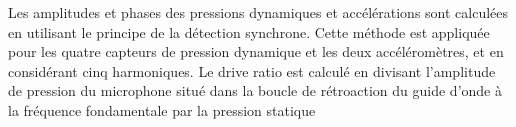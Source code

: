 Les amplitudes et phases des pressions dynamiques et accélérations sont calculées en utilisant le principe de la détection synchrone. Cette méthode est appliquée pour les quatre capteurs de pression dynamique et les deux accéléromètres, et en considérant cinq harmoniques. Le drive ratio est calculé en divisant l'amplitude de pression du microphone situé dans la boucle de rétroaction du guide d'onde à la fréquence fondamentale par la pression statique





%

